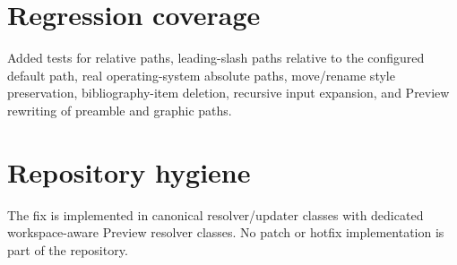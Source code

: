 \documentclass[a4paper]{article}
\begin{document}
\section{Regression coverage}
Added tests for relative paths, leading-slash paths relative to the configured
default path, real operating-system absolute paths, move/rename style
preservation, bibliography-item deletion, recursive input expansion, and Preview
rewriting of preamble and graphic paths.

\section{Repository hygiene}
The fix is implemented in canonical resolver/updater classes with dedicated
workspace-aware Preview resolver classes. No patch or hotfix implementation is
part of the repository.
\end{document}
